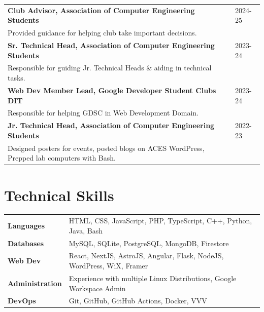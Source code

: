 \documentclass[a4paper,10pt]{article}
\begin{document}
\begin{tabularx}{\linewidth}{@{}l X@{}}	

\textbf{Club Advisor, Association of Computer Engineering Students} & \hfill 
2024-25 \\ \vspace*{1mm}
Provided guidance for helping club take important decisions. \\ 

\textbf{Sr. Technical Head, Association of Computer Engineering Students} & \hfill 
2023-24 \\ \vspace*{1mm}
Responsible for guiding Jr. Technical Heads \& aiding in technical tasks. \\ 

\textbf{Web Dev Member Lead, Google Developer Student Clubs DIT} & \hfill 
2023-24 \\ \vspace*{1mm}
Responsible for helping GDSC in Web Development Domain. \\ 

\textbf{Jr. Technical Head, Association of Computer Engineering Students} & \hfill 
2022-23 \\ 
Designed posters for events, posted blogs on ACES WordPress, Prepped lab computers with Bash. \\ 

\end{tabularx}


\section{Technical Skills}
\begin{tabularx}{\linewidth}{@{}l X@{}}
\textbf{Languages} &  \normalsize{HTML, CSS, JavaScript, PHP, TypeScript, C++, Python, Java, Bash}\\
\textbf{Databases} &  \normalsize{MySQL, SQLite, PostgreSQL, MongoDB, Firestore}\\
\textbf{Web Dev}  &  \normalsize{React, NextJS, AstroJS, Angular,  Flask, NodeJS, WordPress, WiX, Framer}\\
\textbf{Administration} & \normalsize{Experience with multiple Linux Distributions, Google Workspace Admin}\\
\textbf{DevOps}  &  \normalsize{Git, GitHub, GitHub Actions, Docker, VVV}\\
\end{tabularx}
\end{document}
